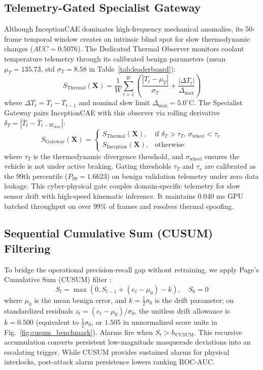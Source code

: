 \documentclass[conference]{IEEEtran}
\begin{document}
\subsection{Telemetry-Gated Specialist Gateway}
Although InceptionCAE dominates high-frequency mechanical anomalies, its 50-frame temporal window creates an intrinsic blind spot for slow thermodynamic changes ($AUC = 0.5076$). The Dedicated Thermal Observer monitors coolant temperature telemetry through its calibrated benign parameters (mean $\mu_T = 135.73$, std $\sigma_T = 8.58$ in Table~\ref{tab:leaderboard}):
\begin{equation}
    S_{\mathrm{Thermal}}(\mathbf{X}) = \frac{1}{W} \sum_{t=1}^W \left( \frac{|T_t - \mu_T|}{\sigma_T} + \frac{|\Delta T_t|}{\Delta_{\max}} \right)
\end{equation}
where $\Delta T_t = T_t - T_{t-1}$ and nominal slew limit $\Delta_{\max} = 5.0^\circ\mathrm{C}$. The Specialist Gateway pairs InceptionCAE with this observer via rolling derivative $\delta_T = |\bar{T}_t - \bar{T}_{t-W_{\mathrm{slow}}}|$:
\begin{equation}
    S_{\mathrm{Gateway}}(\mathbf{X}) = \begin{cases}
    S_{\mathrm{Thermal}}(\mathbf{X}), & \text{if } \delta_T > \tau_T, \, \sigma_{\mathrm{wheel}} < \tau_v \\
    S_{\mathrm{Inception}}(\mathbf{X}), & \text{otherwise}
    \end{cases}
\end{equation}
where $\tau_T$ is the thermodynamic divergence threshold, and $\sigma_{\mathrm{wheel}}$ ensures the vehicle is not under active braking. Gating thresholds $\tau_T$ and $\tau_v$ are calibrated as the 99th percentile ($P_{99} = 1.6623$) on benign validation telemetry under zero data leakage. This cyber-physical gate couples domain-specific telemetry for slow sensor drift with high-speed kinematic inference. It maintains 0.040 ms GPU batched throughput on over 99\% of frames and resolves thermal spoofing.

\subsection{Sequential Cumulative Sum (CUSUM) Filtering}
To bridge the operational precision-recall gap without retraining, we apply Page's Cumulative Sum (CUSUM) filter \cite{page1954cusum}:
\begin{equation}
    S_t = \max\left(0, S_{t-1} + (e_t - \mu_0) - k\right), \quad S_0 = 0
\end{equation}
where $\mu_0$ is the mean benign error, and $k = \frac{1}{2}\sigma_0$ is the drift parameter; on standardized residuals $z_t = (e_t - \mu_0)/\sigma_0$, the unitless drift allowance is $k = 0.500$ (equivalent to $\frac{1}{2}\sigma_0$, or $1.505$ in unnormalized score units in Fig.~\ref{fig:cusum_benchmark}). Alarms fire when $S_t > h_{\mathrm{CUSUM}}$. This recursive accumulation converts persistent low-magnitude masquerade deviations into an escalating trigger. While CUSUM provides sustained alarms for physical interlocks, post-attack alarm persistence lowers ranking ROC-AUC.
\end{document}
